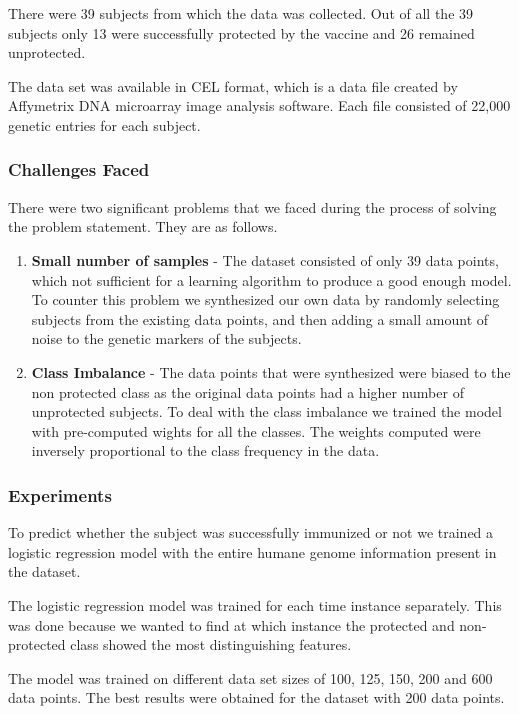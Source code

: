 \documentclass[notitlepage]{article}
\begin{document}
	There were 39 subjects from which the data was collected. Out of all the 39 subjects only 13 were successfully protected by the vaccine and 26 remained unprotected.
	
	The data set was available in CEL format, which is a data file created by Affymetrix DNA microarray image analysis software. Each file consisted of 22,000 genetic entries for each subject.
	
	\subsubsection{Challenges Faced}
	 There were two significant problems that we faced during the process of solving the problem statement. They are as follows.
	 
	 \begin{enumerate}
	 	\item \textbf{Small number of samples} - The dataset consisted of only 39 data points, which not sufficient for a learning algorithm to produce a good enough model. To counter this problem we synthesized our own data by randomly selecting subjects from the existing data points, and then adding a small amount of noise to the genetic markers of the subjects.
	 	
	 	\item \textbf{Class Imbalance} - The data points that were synthesized were biased to the non protected class as the original data points had a higher number of unprotected subjects. To deal with the class imbalance we trained the model with pre-computed wights for all the classes. The weights computed were inversely proportional to the class frequency in the data.
	 \end{enumerate}
	
	\subsubsection{Experiments}
	To predict whether the subject was successfully immunized or not we trained a logistic regression model with the entire humane genome information present in the dataset.
	
	The logistic regression model was trained for each time instance separately. This was done because we wanted to find at which instance the protected and non-protected class showed the most distinguishing features.
	
	The model was trained on different data set sizes of 100, 125, 150, 200 and 600 data points. The best results were obtained for the dataset with 200 data points.
	
\end{document}
